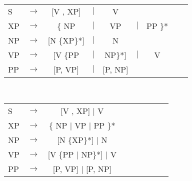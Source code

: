 \documentclass[12pt,a4paper]{article}
\begin{document}
\begin{tabular}{ l  l  c  c  c  c  c  c  c}
S & $\rightarrow$ & [V , XP] & $\mid$ & V \\
XP & $\rightarrow$ & \{ NP & $\mid$ &  VP & $\mid$ & PP \}* \\
   NP & $\rightarrow$ & [N \{XP\}*] & $\mid$ & N \\
VP & $\rightarrow$ & [V \{PP & $\mid$ & NP\}*] & $\mid$ & V \\
   PP & $\rightarrow$ & [P, VP] & $\mid$ & [P, NP] \\
\end{tabular}\\
\newline

\begin{tabular}{ l  l  c  c  c  c  c  c  c}
S & $\rightarrow$ & [V , XP] $\mid$ V \\
XP & $\rightarrow$ & \{ NP $\mid$  VP $\mid$ PP \}* \\
   NP & $\rightarrow$ & [N \{XP\}*] $\mid$ N \\
VP & $\rightarrow$ & [V \{PP $\mid$ NP\}*] $\mid$ V \\
   PP & $\rightarrow$ & [P, VP] $\mid$ [P, NP] \\
\end{tabular}\\
\newline
\end{document}
